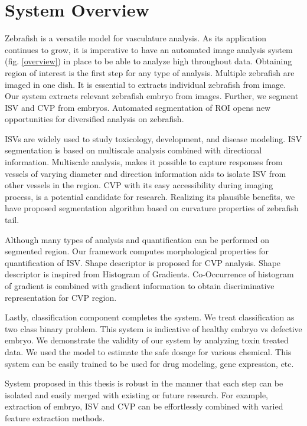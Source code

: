 \section{System Overview}

Zebrafish is a versatile model for vasculature analysis. As its application continues to grow, it is imperative to have an automated image analysis system (fig. \ref{overview}) in place to be able to analyze high throughout data. Obtaining region of interest is the first step for any type of analysis. Multiple zebrafish are imaged in one dish. It is essential to extracts individual zebrafish from image. Our system extracts relevant zebrafish embryo from images. Further, we segment ISV and CVP from embryos. Automated segmentation of ROI opens new opportunities for diversified analysis on zebrafish. 

ISVs are widely used to study toxicology, development, and disease modeling. ISV segmentation is based on multiscale analysis combined with directional information. Multiscale analysis, makes it possible to capture responses from vessels of varying diameter and direction information aids to isolate ISV from other vessels in the region. CVP with its easy accessibility during imaging process, is a potential candidate for research. Realizing its plausible benefits, we have proposed segmentation algorithm based on curvature properties of zebrafish tail.

Although many types of analysis and quantification can be performed on segmented region. Our framework computes morphological properties for quantification of ISV. Shape descriptor is proposed for CVP analysis. Shape descriptor is inspired from Histogram of Gradients. Co-Occurrence of histogram of gradient is combined with gradient information to obtain discriminative representation for CVP region.

Lastly, classification component completes the system. We treat classification as two class binary problem. This system is indicative of healthy embryo vs defective embryo. We demonstrate the validity of our system by analyzing toxin treated data. We used the model to estimate the safe dosage for various chemical. This system can be easily trained to be used for drug modeling, gene expression, etc.

System proposed in this thesis is robust in the manner that each step can be isolated and easily merged with existing or future research. For example, extraction of embryo, ISV and CVP can be effortlessly combined with varied feature extraction methods. 


